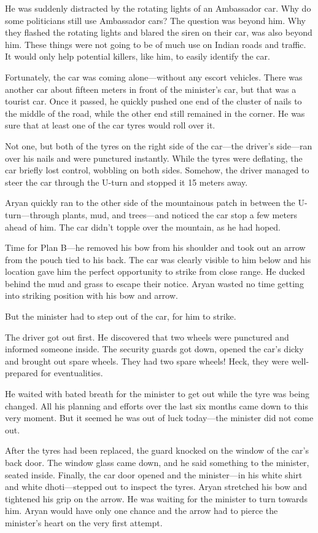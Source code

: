 He was suddenly distracted by the rotating lights of an Ambassador car. Why
do some politicians still use Ambassador cars? The question was beyond him. Why
they flashed the rotating lights and blared the siren on their car, was also
beyond him. These things were not going to be of much use on Indian roads and
traffic. It would only help potential killers, like him, to easily identify the
car.

Fortunately, the car was coming alone—without any escort vehicles. There was
another car about fifteen meters in front of the minister's car, but that was a
tourist car. Once it passed, he quickly pushed one end of the cluster of nails
to the middle of the road, while the other end still remained in the corner. He
was sure that at least one of the car tyres would roll over it.

Not one, but both of the tyres on the right side of the car—the driver's side—ran
over his nails and were punctured instantly. While the tyres were deflating, the
car briefly lost control, wobbling on both sides. Somehow, the driver managed to
steer the car through the U-turn and stopped it 15 meters away.

Aryan quickly ran to the other side of the mountainous patch in between the
U-turn—through plants, mud, and trees—and noticed the car stop a few meters
ahead of him. The car didn't topple over the mountain, as he had hoped.

Time for Plan B—he removed his bow from his shoulder and took out an arrow
from the pouch tied to his back. The car was clearly visible to him below and
his location gave him the perfect opportunity to strike from close range. He
ducked behind the mud and grass to escape their notice. Aryan wasted no time
getting into striking position with his bow and arrow.

But the minister had to step out of the car, for him to strike.

The driver got out first. He discovered that two wheels were punctured and
informed someone inside. The security guards got down, opened the car's dicky
and brought out spare wheels. They had two spare wheels! Heck, they were
well-prepared for eventualities.

He waited with bated breath for the minister to get out while the tyre was being
changed. All his planning and efforts over the last six months came down to this
very moment. But it seemed he was out of luck today—the minister did not come
out.

After the tyres had been replaced, the guard knocked on the window of the car's
back door. The window glass came down, and he said something to the minister,
seated inside. Finally, the car door opened and the minister—in his white shirt
and white dhoti—stepped out to inspect the tyres. Aryan stretched his bow
and tightened his grip on the arrow. He was waiting for the minister to turn
towards him. Aryan would have only one chance and the arrow had to pierce
the minister's heart on the very first attempt.

